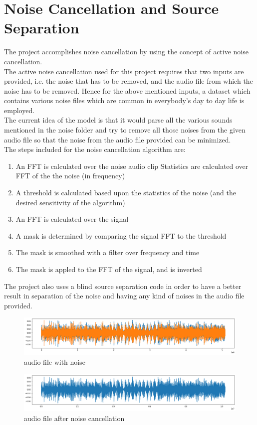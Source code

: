 \documentclass[12pt]{report}
\begin{document}
\section{Noise Cancellation and Source Separation}
The project accomplishes noise cancellation by using the concept of active noise cancellation.\\
The active noise cancellation used for this project requires that two inputs are provided, i.e. the noise that has to be removed, and the audio file from which the noise has to be removed. Hence for the above mentioned inputs, a dataset which contains various noise files which are common in everybody's day to day life is employed.\\The current idea of the model is that it would parse all the various sounds mentioned in the noise folder and try to remove all those noises from the given audio file so that the noise from the audio file provided can be minimized.\\
The steps included for the noise cancellation algorithm are: 
\begin{enumerate}[leftmargin = 2cm]
\item An FFT is calculated over the noise audio clip
Statistics are calculated over FFT of the the noise (in frequency)
\item A threshold is calculated based upon the statistics of the noise (and the desired sensitivity of the algorithm)
\item An FFT is calculated over the signal
\item A mask is determined by comparing the signal FFT to the threshold
\item The mask is smoothed with a filter over frequency and time
\item The mask is appled to the FFT of the signal, and is inverted
\end{enumerate}
The project also uses a blind source separation code in order to have a better result in separation of the noise and having any kind of noises in the audio file provided.
\begin{figure}[ht]
  \includegraphics[width =\columnwidth]{noise_audio.png}
  \caption{audio file with noise}
  \label{song_with_noise}
\end{figure}
\begin{figure}[ht]
  \includegraphics[width =\columnwidth]{noiseless_audio.png}
  \caption{audio file after noise cancellation}
  \label{song_without_noise}
\end{figure}
\end{document}
